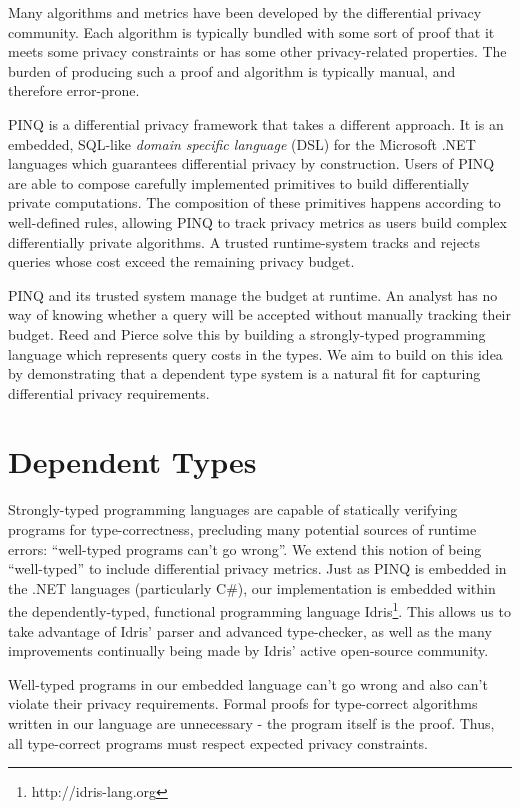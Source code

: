\documentclass[12pt]{report}
\begin{document}
Many algorithms and metrics have been developed by the differential privacy community.
Each algorithm is typically bundled with some sort of proof that it meets some privacy constraints or has some other privacy-related properties.
The burden of producing such a proof and algorithm is typically manual, and therefore error-prone.

PINQ is a differential privacy framework that takes a different approach\cite{conf/sigmod/McSherry09}.
It is an embedded, SQL-like \textit{domain specific language} (DSL) for the Microsoft .NET languages which guarantees differential privacy by construction.
Users of PINQ are able to compose carefully implemented primitives to build differentially private computations.
The composition of these primitives happens according to well-defined rules, allowing PINQ to track privacy metrics as users build complex differentially private algorithms.
A trusted runtime-system tracks and rejects queries whose cost exceed the remaining privacy budget.

PINQ and its trusted system manage the budget at runtime.
An analyst has no way of knowing whether a query will be accepted without manually tracking their budget.
Reed and Pierce solve this by building a strongly-typed programming language which represents query costs in the types\cite{conf/icfp/ReedP10}.
We aim to build on this idea by demonstrating that a dependent type system is a natural fit for capturing differential privacy requirements.

\section{Dependent Types}\label{sec:intro-deptyps}

Strongly-typed programming languages are capable of statically verifying programs for type-correctness, precluding many potential sources of runtime errors: ``well-typed programs can't go wrong''.
We extend this notion of being ``well-typed'' to include differential privacy metrics.
Just as PINQ is embedded in the .NET languages (particularly C\#), our implementation is embedded within the dependently-typed, functional programming language Idris\footnote{http://idris-lang.org}.
This allows us to take advantage of Idris' parser and advanced type-checker, as well as the many improvements continually being made by Idris' active open-source community.

Well-typed programs in our embedded language can't go wrong and also can't violate their privacy requirements.
Formal proofs for type-correct algorithms written in our language are unnecessary - the program itself is the proof.
Thus, all type-correct programs must respect expected privacy constraints.
\end{document}
